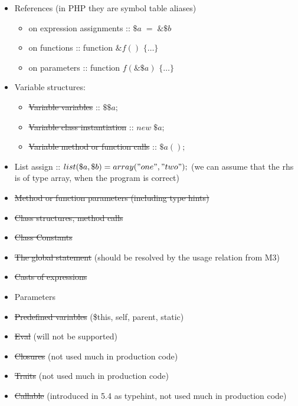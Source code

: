 \documentclass[../main.tex]{subfiles}
\begin{document}
    \begin{itemize}
        
        \item References (in PHP they are symbol table aliases)
        \begin{itemize}
            \item on expression assignments :: $\$a \; = \; \&\$b$
            \item on functions :: function $\&f()$ $\{ \dots \}$
            \item on parameters :: function $f(\&\$a)$ $\{ \dots \}$             
        \end{itemize}

        \item Variable structures:
        \begin{itemize}
            \item \sout{Variable variables} :: $\$\$a;$
            \item \sout{Variable class instantiation} :: $new \; \$a;$
            \item \sout{Variable method or function calls} :: $\$a();$
        \end{itemize}

        \item List assign :: $list(\$a, \$b) = array("one", "two");$ (we can assume that the rhs is of type array, when the program is correct)
        
        \item \sout{Method or function parameters (including type hints)}
        \item \sout{Class structures, method calls}
        \item \sout{Class Constants}
        
        \item \sout{The global statement} (should be resolved by the usage relation from M3)
        
        \item \sout{Casts of expressions}
        
        \item Parameters
        
        \item \sout{Predefined variables} (\$this, self, parent, static)

        \item \sout{Eval} (will not be supported)        
        \item \sout{Closures} (not used much in production code)
        \item \sout{Traits} (not used much in production code)
        \item \sout{Callable} (introduced in 5.4 as typehint, not used much in production code)
        

\end{itemize}
\end{document}
